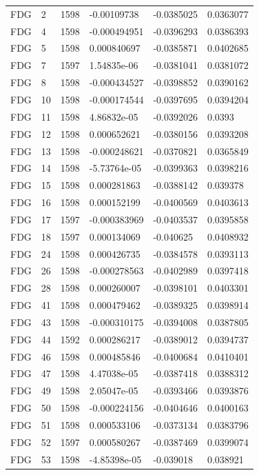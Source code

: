 \begin{longtable}{llllll}
FDG & 2 & 1598 & -0.00109738 & -0.0385025 & 0.0363077 \\
FDG & 4 & 1598 & -0.000494951 & -0.0396293 & 0.0386393 \\
FDG & 5 & 1598 & 0.000840697 & -0.0385871 & 0.0402685 \\
FDG & 7 & 1597 & 1.54835e-06 & -0.0381041 & 0.0381072 \\
FDG & 8 & 1598 & -0.000434527 & -0.0398852 & 0.0390162 \\
FDG & 10 & 1598 & -0.000174544 & -0.0397695 & 0.0394204 \\
FDG & 11 & 1598 & 4.86832e-05 & -0.0392026 & 0.0393 \\
FDG & 12 & 1598 & 0.000652621 & -0.0380156 & 0.0393208 \\
FDG & 13 & 1598 & -0.000248621 & -0.0370821 & 0.0365849 \\
FDG & 14 & 1598 & -5.73764e-05 & -0.0399363 & 0.0398216 \\
FDG & 15 & 1598 & 0.000281863 & -0.0388142 & 0.039378 \\
FDG & 16 & 1598 & 0.000152199 & -0.0400569 & 0.0403613 \\
FDG & 17 & 1597 & -0.000383969 & -0.0403537 & 0.0395858 \\
FDG & 18 & 1597 & 0.000134069 & -0.040625 & 0.0408932 \\
FDG & 24 & 1598 & 0.000426735 & -0.0384578 & 0.0393113 \\
FDG & 26 & 1598 & -0.000278563 & -0.0402989 & 0.0397418 \\
FDG & 28 & 1598 & 0.000260007 & -0.0398101 & 0.0403301 \\
FDG & 41 & 1598 & 0.000479462 & -0.0389325 & 0.0398914 \\
FDG & 43 & 1598 & -0.000310175 & -0.0394008 & 0.0387805 \\
FDG & 44 & 1592 & 0.000286217 & -0.0389012 & 0.0394737 \\
FDG & 46 & 1598 & 0.000485846 & -0.0400684 & 0.0410401 \\
FDG & 47 & 1598 & 4.47038e-05 & -0.0387418 & 0.0388312 \\
FDG & 49 & 1598 & 2.05047e-05 & -0.0393466 & 0.0393876 \\
FDG & 50 & 1598 & -0.000224156 & -0.0404646 & 0.0400163 \\
FDG & 51 & 1598 & 0.000533106 & -0.0373134 & 0.0383796 \\
FDG & 52 & 1597 & 0.000580267 & -0.0387469 & 0.0399074 \\
FDG & 53 & 1598 & -4.85398e-05 & -0.039018 & 0.038921 \\

\end{longtable}

